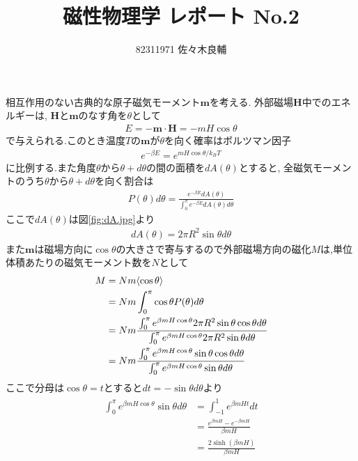 \documentclass[uplatex,a4j,11pt,dvipdfmx]{jsarticle}
\begin{document}
\title{磁性物理学 レポート No.2}
\author{82311971 佐々木良輔}
\date{}
\maketitle
相互作用のない古典的な原子磁気モーメント$\bm m$を考える.
外部磁場$\bm H$中でのエネルギーは, $\bm H$と$\bm m$のなす角を$\theta$として
\begin{align}
  E=-{\bm m}\cdot{\bm H}=-mH\cos\theta
\end{align}
で与えられる.このとき温度$T$の$\bm m$が$\theta$を向く確率はボルツマン因子
\begin{align}
  e^{-\beta E}=e^{mH\cos\theta/k_BT}
\end{align}
に比例する.また角度$\theta$から$\theta+d\theta$の間の面積を$dA(\theta)$とすると,
全磁気モーメントのうち$\theta$から$\theta+d\theta$を向く割合は
\begin{align}
  P(\theta)d\theta=\frac{e^{-\beta E}dA(\theta)}{\int_0^\pi e^{-\beta E}dA(\theta)d\theta}
\end{align}
ここで$dA(\theta)$は図\ref{fig:dA.jpg}より
\begin{align}
  dA(\theta)=2\pi R^2\sin\theta d\theta
\end{align}
また$\bm m$は磁場方向に$\cos\theta$の大きさで寄与するので外部磁場方向の磁化$M$は,単位体積あたりの磁気モーメント数を$N$として
\begin{align}
  \begin{split}
    M&=Nm\langle\cos\theta\rangle\\
    &=Nm\int_0^\pi\cos\theta P(\theta)d\theta\\
    &=Nm\cfrac{\int_0^\pi e^{\beta mH\cos\theta}2\pi R^2\sin\theta\cos\theta d\theta}{\int_0^\pi e^{\beta mH\cos\theta}2\pi R^2\sin\theta d\theta}\\
    &=Nm\cfrac{\int_0^\pi e^{\beta mH\cos\theta}\sin\theta\cos\theta d\theta}{\int_0^\pi e^{\beta mH\cos\theta} \sin\theta d\theta}
  \end{split}
\end{align}
ここで分母は$\cos\theta=t$とすると$dt=-\sin\theta d\theta$より
\begin{align}
  \begin{split}
    \int_0^\pi e^{\beta mH\cos\theta} \sin\theta d\theta&=\int^1_{-1}e^{\beta mHt}dt\\
    &=\frac{e^{\beta mH}-e^{-\beta mH}}{\beta mH}\\
    &=\frac{2\sinh(\beta mH)}{\beta mH}
  \end{split}
\end{align}
\end{document}
